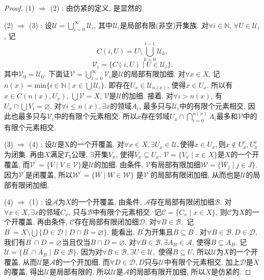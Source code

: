 \documentclass[a4paper,UTF8]{ctexart}
\begin{document}
\begin{proof}
  (1) $\Rightarrow$ (2) :
  由仿紧的定义, 是显然的.
  
  (2) $\Rightarrow$ (3) :
  设$\mathscr{U} = \bigcup_{i = 0}^{\infty} \mathscr{U}_i$,
  其中$\mathscr{U}_i$是局部有限(非空)开集族.
  对$\forall i \in \mathbb{N}$, $\forall U \in \mathscr{U}_i$, 记
  \[
    C(i, U) = U \setminus \bigcup_{k = 0}^{i - 1} \mathscr{U}_k,
  \]
  \[
    \mathscr{V}_i = \{ C(i, U) \mid U \in \mathscr{U}_i \}.
  \]
  其中$\mathscr{V}_0 = \mathscr{U}_0$.
  下面证$\mathscr{V} = \bigcup_{i = 0}^{\infty} \mathscr{V}_i$是$\mathscr{U}$的局部有限加细.
  对$\forall x \in X$,
  记$n(x) = \text{min}\{ i \in \mathbb{N} \mid x \in \bigcup \mathscr{U}_i \}$.
  即存在$U_x \in \mathscr{U}_{n(x)}$, 使得$x \in U_x$.
  所以有$x \in C(n(x), U_x)$, $\bigcup \mathscr{V} = X$, $\mathscr{V}$是$\mathscr{U}$的加细.
  接着, 对$\forall i > n(x)$, 有$U_x \cap \bigcup V_i = \varnothing$.
  对$\forall i \leq n(x), \exists x$的领域$A_i$,
  最多只与$\mathscr{U}_i$中的有限个元素相交,
  因此也最多只与$\mathscr{V}_i$中的有限个元素相交.
  所以$x$存在邻域$U_x \cap \bigcap_{i = 0}^{n(x)} A_i$最多和$\mathscr{V}$中的有限个元素相交.

  (3) $\Rightarrow$ (4) :
  设$\mathscr{U}$是X的一个开覆盖.
  对$\forall x \in X, \exists U_x \in \mathscr{U},
  $使得$x \in U_x, $则$x \notin U_x^c, U_x^c$为闭集.
  再由$X$满足$T_3$公理, $\exists $开集$V_x$, 使得$\overline{V_x} \subseteq U_x$.
  $\mathscr{V} = \{ V_x \mid x \in X \}$是$X$的一个开覆盖,
  而$\mathscr{V}^{'} = \{ \overline{V} \mid V \in \mathscr{V} \}$是$\mathscr{U}$的加细.
  由条件, $\mathscr{V}$有局部有限加细$\mathscr{W} = \{ W_j \mid j \in J \}$.
  因为$\mathscr{V}^{'}$是闭覆盖,
  所以$\mathscr{W}^{'} = \{ \overline{W} \mid W \in \mathscr{W} \}$
  是$\mathscr{V}^{'}$的局部有限闭加细, 从而也是$\mathscr{U}$的局部有限闭加细.
  
  (4) $\Rightarrow$ (1) :
  设$\mathscr{A}$为$X$的一个开覆盖, 由条件,
  $\mathscr{A}$存在局部有限闭加细$\mathscr{B}$.
  对$\forall x \in X, \exists x$的邻域$C_x$, 只与$\mathscr{B}$中有限个元素相交.
  记$\mathscr{C} = \{ C_x \mid x \in X \}$, 则$\mathscr{C}$为$X$的一个开覆盖.
  再由条件, $\mathscr{C}$存在局部有限闭加细$\mathscr{D}$.
  对$\forall B \in \mathscr{B},$ 
  记$B^{'} = X \setminus \bigcup \{ D \in \mathscr{D} \mid D \cap B = \varnothing \}$.
  能看出, $B^{'}$为开集且$B \subseteq B^{'}$.
  对$\forall B \in \mathscr{B}, D \in \mathscr{D}$,
  我们有$B^{'} \cap D = \varnothing$当且仅当$B \cap D = \varnothing$.
  对$\forall B \in \mathscr{B}, \exists A_B \in \mathscr{A}$,
  使得$B \subseteq A_B$. 记$\mathscr{U} = \{ B^{'} \cap A_B \mid B \in \mathscr{B} \}$.
  因为对$\forall B \in \mathscr{B}, \exists U \in \mathscr{U},$ 
  使得$B \subseteq U$, 所以$\mathscr{U}$为$X$的一个开覆盖, 
  从而$\mathscr{U}$是$\mathscr{A}$的一个开加细.
  而$\forall D \in \mathscr{D}, D$只与$\mathscr{U}$中有限个元素相交.
  加上$\mathscr{D}$是$X$的覆盖, 得出$\mathscr{U}$是局部有限的.
  所以$\mathscr{U}$是$\mathscr{A}$的局部有限开加细, 所以$X$是仿紧的.
\end{proof}
\end{document}
